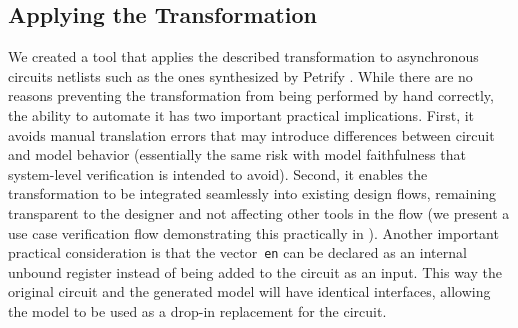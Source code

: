 \subsection{Applying the Transformation}

We created a tool that applies the described transformation to asynchronous
circuits netlists such as the ones synthesized by Petrify
\cite{cortadella1997petrify}. While there are no reasons preventing the
transformation from being performed by hand correctly, the ability to automate
it has two important practical implications. First, it avoids manual
translation errors that may introduce differences between circuit and model
behavior (essentially the same risk with model faithfulness that system-level
verification is intended to avoid). Second, it enables the transformation to
be integrated seamlessly into existing design flows, remaining transparent to
the designer and not affecting other tools in the flow (we present a use case
verification flow demonstrating this practically in ).
Another important practical consideration is that the vector~\texttt{en} can
be declared as an internal unbound register instead of being added to the
circuit as an input. This way the original circuit and the generated model
will have identical interfaces, allowing the model to be used as a drop-in
replacement for the circuit.
